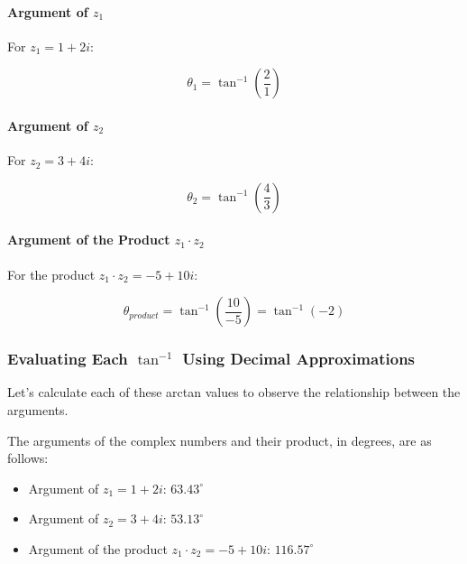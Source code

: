 \documentclass[
]{article}
\providecommand{\tightlist}{%
  \setlength{\itemsep}{0pt}\setlength{\parskip}{0pt}}
\def\tightlist{}
\begin{document}
\paragraph{\texorpdfstring{Argument of
\(z_1\)}{Argument of z\_1}}\label{argument-of-z_1}

For \(z_1 = 1 + 2i\):

\[
\theta_1 = \tan^{-1}\left(\frac{2}{1}\right)
\]

\paragraph{\texorpdfstring{Argument of
\(z_2\)}{Argument of z\_2}}\label{argument-of-z_2}

For \(z_2 = 3 + 4i\):

\[
\theta_2 = \tan^{-1}\left(\frac{4}{3}\right)
\]

\paragraph{\texorpdfstring{Argument of the Product
\(z_1 \cdot z_2\)}{Argument of the Product z\_1 \textbackslash cdot z\_2}}\label{argument-of-the-product-z_1-cdot-z_2}

For the product \(z_1 \cdot z_2 = -5 + 10i\):

\[
\theta_{product} = \tan^{-1}\left(\frac{10}{-5}\right) = \tan^{-1}(-2)
\]

\subsubsection{\texorpdfstring{Evaluating Each \(\tan^{-1}\) Using
Decimal
Approximations}{Evaluating Each \textbackslash tan\^{}\{-1\} Using Decimal Approximations}}\label{evaluating-each-tan-1-using-decimal-approximations}

Let's calculate each of these arctan values to observe the relationship
between the arguments.

The arguments of the complex numbers and their product, in degrees, are
as follows:

\begin{itemize}
\tightlist
\item
  Argument of \(z_1 = 1 + 2i\): \(63.43^\circ\)
\item
  Argument of \(z_2 = 3 + 4i\): \(53.13^\circ\)
\item
  Argument of the product \(z_1 \cdot z_2 = -5 + 10i\): \(116.57^\circ\)
\end{itemize}
\end{document}
